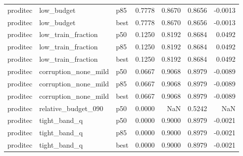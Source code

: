 \begin{tabular}{lllrrrr}
proditec &           low\_budget &    p85 &                           0.7778 &                      0.8670 &                 0.8656 &                          -0.0013 \\
proditec &           low\_budget &   best &                           0.7778 &                      0.8670 &                 0.8656 &                          -0.0013 \\
proditec &   low\_train\_fraction &    p50 &                           0.1250 &                      0.8192 &                 0.8684 &                           0.0492 \\
proditec &   low\_train\_fraction &    p85 &                           0.1250 &                      0.8192 &                 0.8684 &                           0.0492 \\
proditec &   low\_train\_fraction &   best &                           0.1250 &                      0.8192 &                 0.8684 &                           0.0492 \\
proditec & corruption\_none\_mild &    p50 &                           0.0667 &                      0.9068 &                 0.8979 &                          -0.0089 \\
proditec & corruption\_none\_mild &    p85 &                           0.0667 &                      0.9068 &                 0.8979 &                          -0.0089 \\
proditec & corruption\_none\_mild &   best &                           0.0667 &                      0.9068 &                 0.8979 &                          -0.0089 \\
proditec &  relative\_budget\_090 &    p50 &                           0.0000 &                         NaN &                 0.5242 &                              NaN \\
proditec &         tight\_band\_q &    p50 &                           0.0000 &                      0.9000 &                 0.8979 &                          -0.0021 \\
proditec &         tight\_band\_q &    p85 &                           0.0000 &                      0.9000 &                 0.8979 &                          -0.0021 \\
proditec &         tight\_band\_q &   best &                           0.0000 &                      0.9000 &                 0.8979 &                          -0.0021 \\
\bottomrule
\end{tabular}
